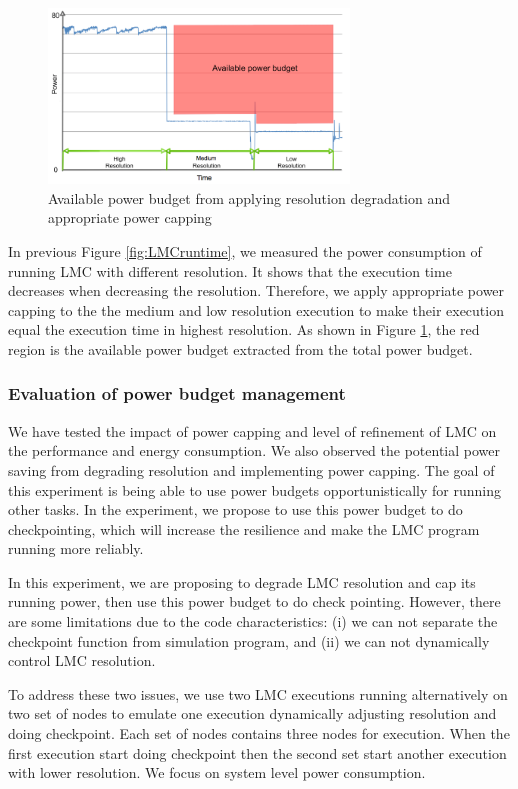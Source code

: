 \documentclass[10pt, conference, compsocconf]{IEEEtran}
\begin{document}
\begin{figure}[H]
	\centering
    \includegraphics[width=8cm]{figs/Available_power_budget.png}
        \caption{Available power budget from applying resolution degradation and appropriate power capping}
        \label{fig:Available_power_budget}
\end{figure}


In previous Figure \ref{fig:LMCruntime}, we measured the power consumption of running LMC with different resolution. It shows that the execution time decreases when decreasing the resolution. Therefore, we apply appropriate power capping to the the medium and low resolution execution to make their execution equal the execution time in highest resolution. As shown in Figure \ref{fig:Available_power_budget}, the red region is the available power budget extracted from the total power budget. 



\subsubsection{Evaluation of power budget management}
We have tested the impact of power capping and level of refinement of LMC on the performance and energy consumption. We also observed the potential power saving from degrading resolution and implementing power capping. The goal of this experiment is being able to use power budgets opportunistically for running other tasks. In the experiment, we propose to use this power budget to do  checkpointing, which will increase the resilience and make the LMC program running more reliably. 

In this experiment, we are proposing to degrade LMC resolution and cap its running power, then use this power budget to do check pointing. However, there are some limitations due to the code characteristics: (i) we can not separate the checkpoint function from simulation program, and (ii) we can not dynamically control LMC resolution. 

To address these two issues, we use two LMC executions running alternatively on two set of nodes to emulate one execution dynamically adjusting resolution and doing checkpoint. Each set of nodes contains three nodes for execution. When the first execution start doing checkpoint then the second set start another execution with lower resolution. We focus on system level power consumption. 
\end{document}
